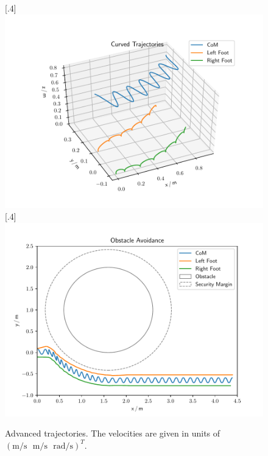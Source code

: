 \begin{figure}[h!]
	\centering
	[.4\linewidth]{\includegraphics[scale=.35]{chapters/05_experiments/01_user_controlled_walking/01_benchmarking/nmpc_turn.pdf}}
	[.4\linewidth]{\includegraphics[scale=.35]{chapters/05_experiments/01_user_controlled_walking/01_benchmarking/nmpc_obstacle.pdf}}
	\caption{Advanced trajectories. The velocities are given in units of\\$(\text{m}/\text{s}\,\,\,\,\text{m}/\text{s}\,\,\,\,\text{rad}/\text{s})^T$.}
	\label{fig::511_benchmarking_advanced}
\end{figure} 
